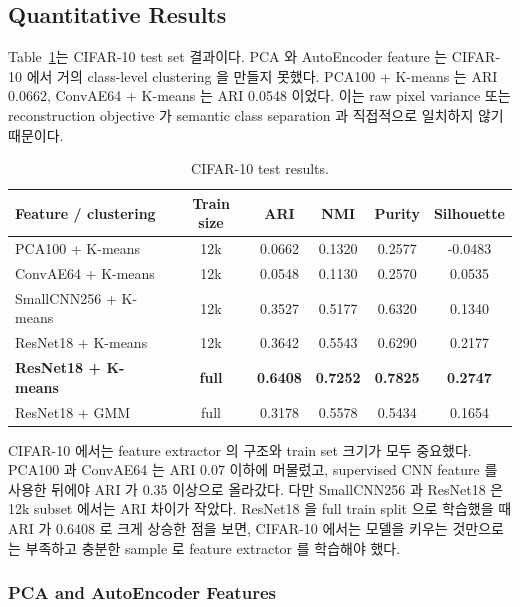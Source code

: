 \documentclass[11pt]{article}
\begin{document}
\subsection{Quantitative Results}

Table~\ref{tab:cifar-results}는 CIFAR-10 test set 결과이다.
PCA 와 AutoEncoder feature 는 CIFAR-10 에서 거의 class-level clustering 을 만들지 못했다.
PCA100 + K-means 는 ARI 0.0662, ConvAE64 + K-means 는 ARI 0.0548 이었다.
이는 raw pixel variance 또는 reconstruction objective 가 semantic class separation 과 직접적으로 일치하지 않기 때문이다.

\begin{table}[H]
    \centering
    \caption{CIFAR-10 test results.}
    \label{tab:cifar-results}
    \begin{tabular}{lccccc}
        \toprule
        Feature / clustering & Train size & ARI & NMI & Purity & Silhouette\\
        \midrule
        PCA100 + K-means & 12k & 0.0662 & 0.1320 & 0.2577 & -0.0483\\
        ConvAE64 + K-means & 12k & 0.0548 & 0.1130 & 0.2570 & 0.0535\\
        SmallCNN256 + K-means & 12k & 0.3527 & 0.5177 & 0.6320 & 0.1340\\
        ResNet18 + K-means & 12k & 0.3642 & 0.5543 & 0.6290 & 0.2177\\
        \textbf{ResNet18 + K-means} & \textbf{full} & \textbf{0.6408} & \textbf{0.7252} & \textbf{0.7825} & \textbf{0.2747}\\
        ResNet18 + GMM & full & 0.3178 & 0.5578 & 0.5434 & 0.1654\\
        \bottomrule
    \end{tabular}
\end{table}

CIFAR-10 에서는 feature extractor 의 구조와 train set 크기가 모두 중요했다.
PCA100 과 ConvAE64 는 ARI 0.07 이하에 머물렀고, supervised CNN feature 를 사용한 뒤에야 ARI 가 0.35 이상으로 올라갔다.
다만 SmallCNN256 과 ResNet18 은 12k subset 에서는 ARI 차이가 작았다.
ResNet18 을 full train split 으로 학습했을 때 ARI 가 0.6408 로 크게 상승한 점을 보면, CIFAR-10 에서는 모델을 키우는 것만으로는 부족하고 충분한 sample 로 feature extractor 를 학습해야 했다.

\subsubsection{PCA and AutoEncoder Features}
\end{document}
